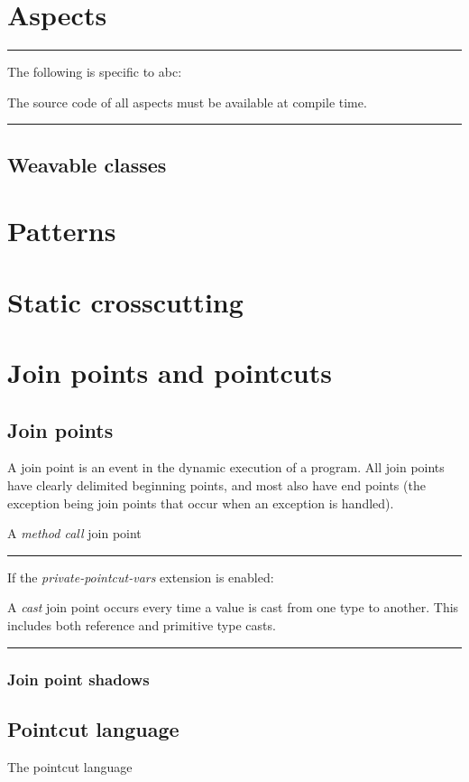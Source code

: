 \documentclass[12pt,a4paper]{report}
\newcommand\extensionbegin[1]{%
\begin{extension:#1}
\hrule
\noindent
If the {\em #1} extension is enabled:

\noindent
}
\newcommand\extensionend[1]{%
\hrule
\end{extension:#1}}
\newcommand\abcdistinctionbegin[0]{%
\hrule
\noindent
The following is specific to abc:

\noindent
}
\newcommand\abcdistinctionend[0]{%
\hrule
}
\begin{document}
\chapter{Aspects}

\abcdistinctionbegin
The source code of all aspects must be available at compile time.
\abcdistinctionend

\section{Weavable classes}

\chapter{Patterns}

\chapter{Static crosscutting}

\chapter{Join points and pointcuts}

\section{Join points}

A join point is an event in the dynamic execution of a program. 
All join points have clearly delimited beginning points, 
and most also have end points (the exception being join points that occur
when an exception is handled).

A {\em method call} join point

\extensionbegin{private-pointcut-vars}
A {\em cast} join point occurs every time a value is cast from one type
to another. This includes both reference and primitive type casts.
\extensionend{private-pointcut-vars}

\subsection{Join point shadows}

\section{Pointcut language}

The pointcut language
\end{document}
